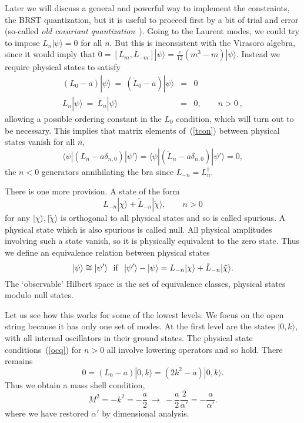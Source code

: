 Later we will discuss a general and powerful way to implement the
constraints, the BRST quantization, but it is useful to proceed
first by a bit of trial and error (so-called {\it old covariant
quantization}~\cite{Brow}).  Going to the Laurent modes, we
could try to impose 
$L_n |\psi\rangle = 0$ for all $n$.  But this is inconsistent with
the Virasoro algebra, since it would imply that 
$0 = [L_m, L_{-m}]  |\psi\rangle = \frac{c}{12} (m^3 - m) 
|\psi\rangle$.  Instead we require physical states to satisfy
\begin{eqnarray}
(L_0 - a) |\psi\rangle \ =\ (\tilde L_0 - a) |\psi\rangle &=& 0
\nonumber\\
L_n |\psi\rangle \ =\ \tilde L_n |\psi\rangle &=& 0, \qquad n>0\ ,
\label{ocq}
\end{eqnarray}
allowing a possible ordering constant in the $L_0$ condition, which
will turn out to be necessary.
This implies that matrix elements 
of~(\ref{tcon}) between physical states vanish for {all} $n$,
\begin{equation}
\langle \psi | (L_n - a \delta_{n,0}) | \psi' \rangle =
\langle \psi | (\tilde L_n - a \delta_{n,0}) | \psi' \rangle = 0,
\end{equation}
the $n < 0$ generators annihilating the bra since $L_{-n} =
L^\dagger_n$.

There is one more provision.  A state of the form
\begin{equation}
L_{-n} | \chi \rangle + \tilde L_{-n} | \tilde\chi \rangle,
\qquad n>0
\end{equation}
for any $|\chi \rangle, | \tilde\chi \rangle$
is orthogonal to all physical states and so is called spurious.
A physical state which is also spurious is called null.
All physical amplitudes involving such a state vanish, so it is
physically equivalent to the zero state.  Thus we define an
equivalence relation between physical states
\begin{equation}
|\psi\rangle \cong |\psi'\rangle \ \ {\rm if}
\ \ |\psi'\rangle - |\psi\rangle = L_{-n} | \chi \rangle + \tilde
L_{-n} | \tilde\chi \rangle.
\end{equation}
The `observable' Hilbert space is the set of equivalence classes,
physical states modulo null states.

Let us see how this works for some of the lowest levels.  We focus
on the open string because it has only one set of modes.  At the
first level are the states $|0,k\rangle$, with all internal
oscillators in their ground states.  The physical state
conditions~(\ref{ocq}) for $n>0$ all involve lowering operators
and so hold.  There remains
\begin{equation}
0 = (L_0 - a)|0,k\rangle = (2k^2 - a) |0,k\rangle.
\end{equation}
Thus we obtain a mass shell condition,
\begin{equation}
M^2 = -k^2 = -\frac{a}{2} \ \to\ -\frac{a}{2} \frac{2}{\alpha'}
= -\frac{a}{\alpha'}. \label{tach}
\end{equation}
where we have restored $\alpha'$ by dimensional analysis.

